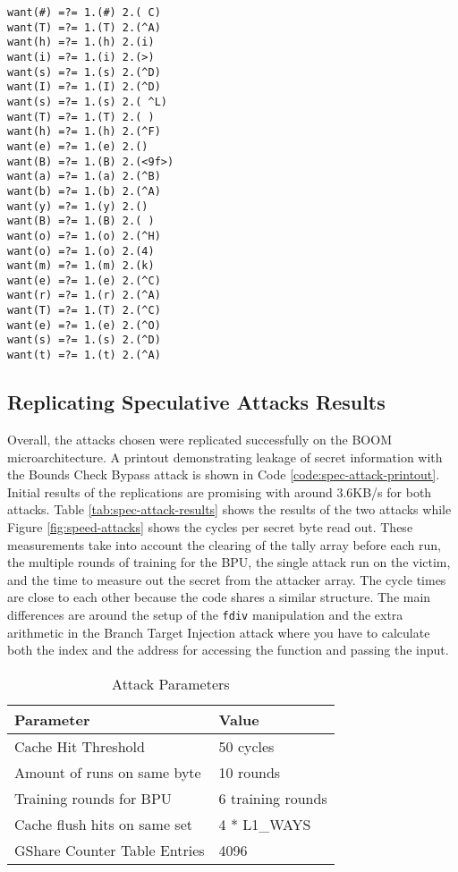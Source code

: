 \begin{lstlisting}[style=column-code, label={code:spec-attack-printout}, caption=Printout of Bounds Check Bypass Attack]
want(#) =?= 1.(#) 2.( C)
want(T) =?= 1.(T) 2.(^A)
want(h) =?= 1.(h) 2.(i)
want(i) =?= 1.(i) 2.(>)
want(s) =?= 1.(s) 2.(^D)
want(I) =?= 1.(I) 2.(^D)
want(s) =?= 1.(s) 2.( ^L)
want(T) =?= 1.(T) 2.( )
want(h) =?= 1.(h) 2.(^F)
want(e) =?= 1.(e) 2.()
want(B) =?= 1.(B) 2.(<9f>)
want(a) =?= 1.(a) 2.(^B)
want(b) =?= 1.(b) 2.(^A)
want(y) =?= 1.(y) 2.()
want(B) =?= 1.(B) 2.( )
want(o) =?= 1.(o) 2.(^H)
want(o) =?= 1.(o) 2.(4)
want(m) =?= 1.(m) 2.(k)
want(e) =?= 1.(e) 2.(^C)
want(r) =?= 1.(r) 2.(^A)
want(T) =?= 1.(T) 2.(^C)
want(e) =?= 1.(e) 2.(^O)
want(s) =?= 1.(s) 2.(^D)
want(t) =?= 1.(t) 2.(^A)
\end{lstlisting}

\subsection{Replicating Speculative Attacks Results}

Overall, the attacks chosen were replicated successfully on the BOOM microarchitecture. A printout
demonstrating leakage of secret information with the Bounds Check Bypass attack
is shown in Code \ref{code:spec-attack-printout}. Initial results of the replications
are promising with around 3.6KB/s for both attacks. Table \ref{tab:spec-attack-results}
shows the results of the two attacks while Figure \ref{fig:speed-attacks} shows the cycles per secret byte read out.
These measurements take into account the clearing
of the tally array before each run, the multiple rounds of training for the BPU,
the single attack run on the victim, and the time to measure out the secret from the attacker array.
The cycle times are close to each other because the code shares a similar structure. The main
differences are around the setup of the {\tt fdiv} manipulation
and the extra arithmetic in the Branch Target Injection attack where you have to calculate
both the index and the address for accessing the function and passing the input. 

\begin{table}
\centering
\caption{Attack Parameters}
\label{tab:attack-params}
\begin{tabular}{@{} *2l @{}} \toprule
    Parameter                    & Value \\ \midrule
    Cache Hit Threshold          & 50 cycles \\
    Amount of runs on same byte  & 10 rounds \\
    Training rounds for BPU      & 6 training rounds \\
    Cache flush hits on same set & 4 * L1\_WAYS \\
    GShare Counter Table Entries & 4096 \\ \bottomrule
\end{tabular}
\end{table} 

